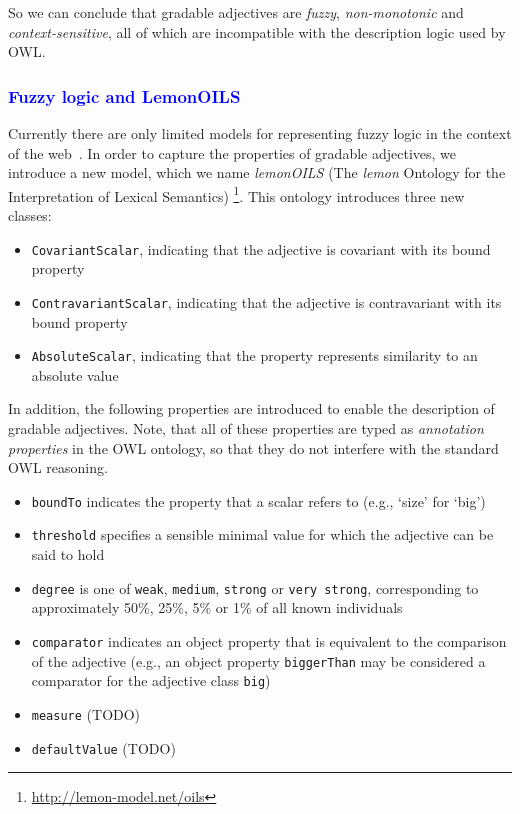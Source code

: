 \documentclass[11pt]{article}
\begin{document}
So we can conclude that gradable adjectives are \emph{fuzzy}, \emph{non-monotonic} 
and \emph{context-sensitive}, all of which are incompatible with the description 
logic used by OWL.

\subsubsection{\textcolor{blue}{Fuzzy logic and LemonOILS}}
Currently there are only limited models for representing fuzzy 
logic in the context of the web~\cite{zhao2008uncertainty}. In order to capture the 
properties of gradable adjectives, we introduce a new model, which we name 
\emph{lemonOILS} (The \emph{lemon} Ontology for the Interpretation of Lexical Semantics)
\footnote{\url{http://lemon-model.net/oils}}. This ontology introduces three 
new classes:

\begin{itemize}
	\item {\tt CovariantScalar}, indicating that the adjective is covariant with its bound property
	\item {\tt ContravariantScalar}, indicating that the adjective is contravariant with its bound property
	\item {\tt AbsoluteScalar}, indicating that the property represents similarity to an absolute value
\end{itemize}

In addition, the following properties are introduced to enable the description 
of gradable adjectives. Note, that all of these properties are typed as 
\emph{annotation properties} in the OWL ontology, so that they do not interfere 
with the standard OWL reasoning.

\begin{itemize}
	\item {\tt boundTo} indicates the property that a scalar refers to (e.g., `size' for `big')
	\item {\tt threshold} specifies a sensible minimal value for which the adjective can be said to hold
	\item {\tt degree} is one of {\tt weak}, {\tt medium}, {\tt strong} or {\tt very strong}, corresponding to approximately 50\%, 25\%, 5\% or 1\% of all known individuals
	\item {\tt comparator} indicates an object property that is equivalent to the comparison of the adjective (e.g., an object property {\tt biggerThan} may be considered a comparator for the adjective class {\tt big})
	\item {\tt measure} (TODO)
	\item {\tt defaultValue} (TODO)
\end{itemize}
\end{document}

